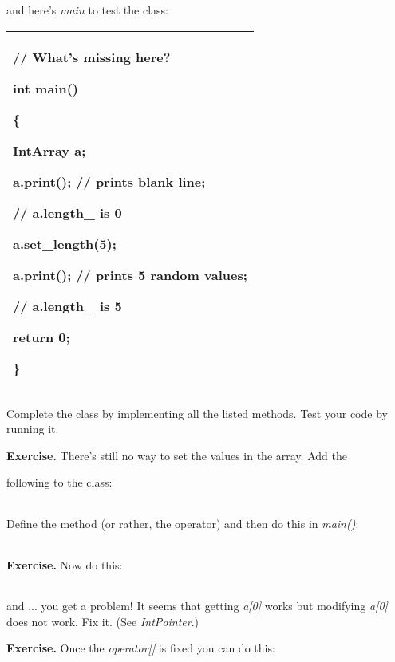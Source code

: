 \documentclass[
]{article}
\begin{document}
and here's \emph{main} to test the class:

\begin{longtable}[]{@{}l@{}}
\toprule
\endhead
\begin{minipage}[t]{0.97\columnwidth}\raggedright
// What's missing here?

int main()

\{

IntArray a;

a.print(); // prints blank line;

// a.length\_ is 0

a.set\_length(5);

a.print(); // prints 5 random values;

// a.length\_ is 5

return 0;

\}\strut
\end{minipage}\tabularnewline
\bottomrule
\end{longtable}

Complete the class by implementing all the listed methods. Test your
code by running it.

\textbf{Exercise.} There's still no way to set the values in the array.
Add the

following to the class:

\begin{longtable}[]{@{}@{}}
\toprule
\endhead
\bottomrule
\end{longtable}

Define the method (or rather, the operator) and then do this in
\emph{main()}:

\begin{longtable}[]{@{}@{}}
\toprule
\endhead
\bottomrule
\end{longtable}

\textbf{Exercise.} Now do this:

\begin{longtable}[]{@{}@{}}
\toprule
\endhead
\bottomrule
\end{longtable}

and ... you get a problem! It seems that getting \emph{a{[}0{]}} works
but modifying \emph{a{[}0{]}} does not work. Fix it. (See
\emph{IntPointer}.)

\textbf{Exercise.} Once the \emph{operator{[}{]}} is fixed you can do
this:
\end{document}
